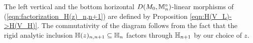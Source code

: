 \documentclass[10pt]{amsart}
\begin{document}

The left vertical and the bottom horizontal $D(M_{0},\mathbb{M}_{n}^{\circ})$-linear morphisms of (\ref{eqn:factorization_H(z)_n,n+1}) are defined by Proposition \ref{eqn:H(V_L)->H(V_H)}. The commutativity of the diagram follows from the fact that the rigid analytic inclusion $\mathbb{H}(z)_{n,n+1}\subseteq \mathbb{H}_{n}$ factors through $\mathbb{H}_{n+1}$ by our choice of $z$. 
\end{document}
